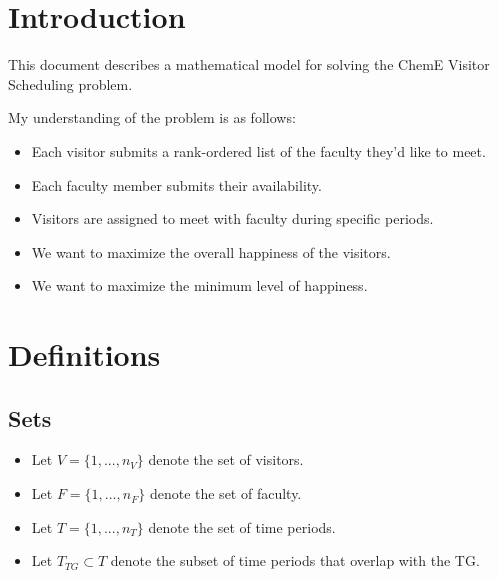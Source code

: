 \documentclass[12pt]{article}
\theoremstyle{definition}
\newtheorem{definition set}{Definition Set}%
\newtheorem{problem statement}{Problem Statement} %
\theoremstyle{remark}
\theoremstyle{remark}
\begin{document}
\maketitle

\section{Introduction}
This document describes a mathematical model for solving the ChemE Visitor Scheduling problem.

My understanding of the problem is as follows:
\begin{itemize}
\item
Each visitor submits a rank-ordered list of the faculty they\rq{}d like to meet.

\item
Each faculty member submits their availability.

\item
Visitors are assigned to meet with faculty during specific periods.

\item
We want to maximize the overall happiness of the visitors.

\item
We want to maximize the minimum level of happiness.
\end{itemize}

\section{Definitions}
\subsection{Sets}
\begin{itemize}
\item
Let $V = \{1,...,n_V\}$ denote the set of visitors.

\item
Let $F = \{1,...,n_F\}$ denote the set of faculty.

\item
Let $T = \{1,...,n_T\}$ denote the set of time periods.

\item
Let $T_{TG} \subset T$ denote the subset of time periods that overlap with the TG.
\end{itemize}
\end{document}
